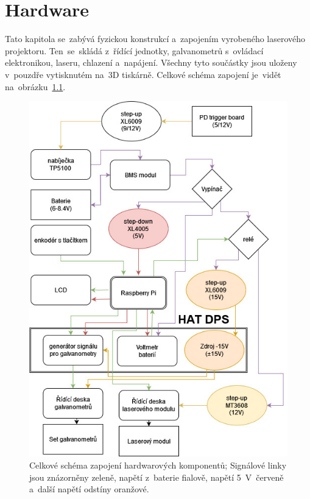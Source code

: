 \chapter{Hardware}
Tato kapitola se~zabývá fyzickou konstrukcí a~zapojením vyrobeného laserového projektoru. Ten~se~skládá z~řídící jednotky, galvanometrů s~ovládací elektronikou, laseru, chlazení a~napájení. Všechny tyto součástky jsou uloženy v~pouzdře vytisknutém na~3D tiskárně. Celkové schéma zapojení je~vidět na~obrázku~\ref{fig:scheme-whole}.

\begin{figure}[H]
  \centering
  \includegraphics[width=\textwidth{}]{img/whole-scheme.jpg}
  \caption{\label{fig:scheme-whole} Celkové schéma zapojení hardwarových komponentů; Signálové linky jsou znázorněny zeleně, napětí z~baterie fialově, napětí 5~V~červeně a~další napětí odstíny oranžové.}
\end{figure}

